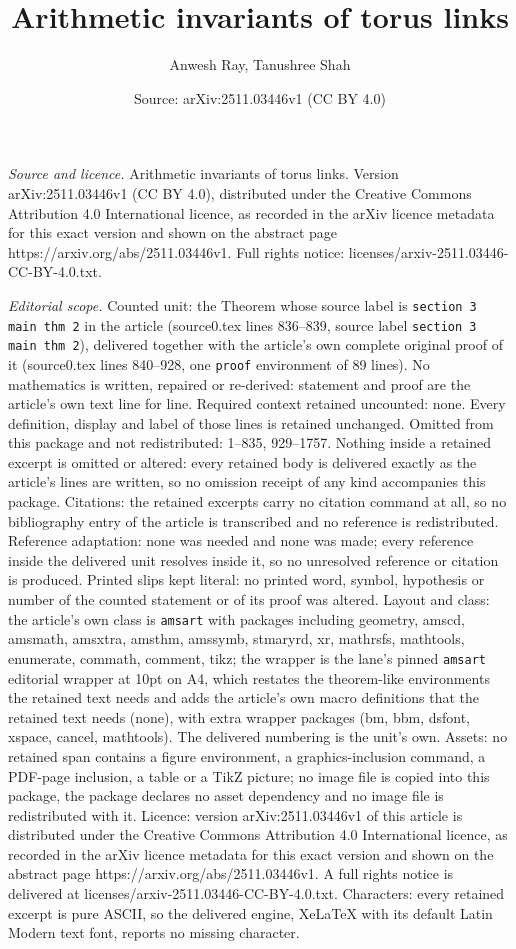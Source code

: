 \documentclass[10pt,a4paper]{amsart}
\title[Arithmetic invariants of torus links]{Arithmetic invariants of torus links}
\author{Anwesh Ray, Tanushree Shah}
\date{Source: arXiv:2511.03446v1 (CC BY 4.0)}
\begin{document}
\maketitle

\noindent\emph{Source and licence.} Arithmetic invariants of torus links. Version arXiv:2511.03446v1 (CC BY 4.0), distributed under the Creative Commons Attribution 4.0 International licence, as recorded in the arXiv licence metadata for this exact version and shown on the abstract page https://arxiv.org/abs/2511.03446v1. Full rights notice: licenses/arxiv-2511.03446-CC-BY-4.0.txt.\par\smallskip

\noindent\textit{Editorial scope.} Counted unit: the Theorem whose source label is \texttt{section 3 main thm 2} in the article (source0.tex lines 836--839, source label \texttt{section 3 main thm 2}), delivered together with the article's own complete original proof of it (source0.tex lines 840--928, one \texttt{proof} environment of 89 lines). No mathematics is written, repaired or re-derived: statement and proof are the article's own text line for line. Required context retained uncounted: none. Every definition, display and label of those lines is retained unchanged. Omitted from this package and not redistributed: 1--835, 929--1757. Nothing inside a retained excerpt is omitted or altered: every retained body is delivered exactly as the article's lines are written, so no omission receipt of any kind accompanies this package. Citations: the retained excerpts carry no citation command at all, so no bibliography entry of the article is transcribed and no reference is redistributed. Reference adaptation: none was needed and none was made; every reference inside the delivered unit resolves inside it, so no unresolved reference or citation is produced. Printed slips kept literal: no printed word, symbol, hypothesis or number of the counted statement or of its proof was altered. Layout and class: the article's own class is \texttt{amsart} with packages including geometry, amscd, amsmath, amsxtra, amsthm, amssymb, stmaryrd, xr, mathrsfs, mathtools, enumerate, commath, comment, tikz; the wrapper is the lane's pinned \texttt{amsart} editorial wrapper at 10pt on A4, which restates the theorem-like environments the retained text needs and adds the article's own macro definitions that the retained text needs (none), with extra wrapper packages (bm, bbm, dsfont, xspace, cancel, mathtools). The delivered numbering is the unit's own. Assets: no retained span contains a figure environment, a graphics-inclusion command, a PDF-page inclusion, a table or a TikZ picture; no image file is copied into this package, the package declares no asset dependency and no image file is redistributed with it. Licence: version arXiv:2511.03446v1 of this article is distributed under the Creative Commons Attribution 4.0 International licence, as recorded in the arXiv licence metadata for this exact version and shown on the abstract page https://arxiv.org/abs/2511.03446v1. A full rights notice is delivered at licenses/arxiv-2511.03446-CC-BY-4.0.txt. Characters: every retained excerpt is pure ASCII, so the delivered engine, XeLaTeX with its default Latin Modern text font, reports no missing character.
\end{document}
